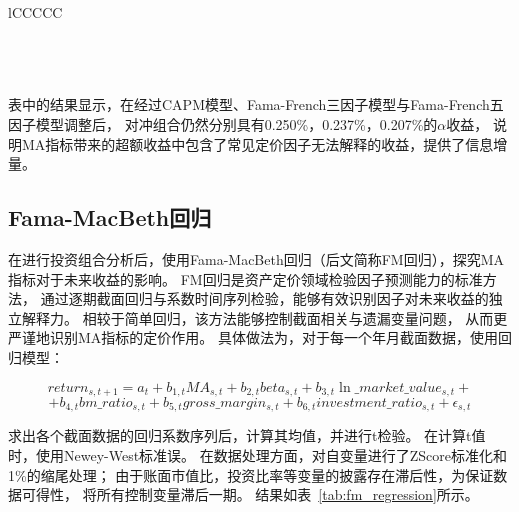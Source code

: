 {\begin{table}[H]
\begin{tabularx}{\textwidth}{lCCCCC}
    \bottomrule
     \\
     \\
     \\
     \\
  \end{tabularx}
\end{table}
}

表中的结果显示，在经过CAPM模型、Fama-French三因子模型与Fama-French五因子模型调整后，
对冲组合仍然分别具有0.250\%，0.237\%，0.207\%的$\alpha$收益，
说明MA指标带来的超额收益中包含了常见定价因子无法解释的收益，提供了信息增量。

 \FloatBarrier

\subsection{Fama-MacBeth回归}

在进行投资组合分析后，使用Fama-MacBeth回归（后文简称FM回归），探究MA指标对于未来收益的影响。
FM回归是资产定价领域检验因子预测能力的标准方法，
通过逐期截面回归与系数时间序列检验，能够有效识别因子对未来收益的独立解释力。
相较于简单回归，该方法能够控制截面相关与遗漏变量问题，
从而更严谨地识别MA指标的定价作用。
具体做法为，对于每一个年月截面数据，使用回归模型：

\[
return_{s,t+1} = a_{t} + b_{1,t} MA_{s,t} + b_{2,t} beta_{s,t} + b_{3,t} \ln\_market\_value_{s,t} +
\]
\[
+ b_{4,t} bm\_ratio_{s,t} + b_{5,t} gross\_margin_{s,t} + b_{6,t} investment\_ratio_{s,t} + \epsilon_{s,t}
\]

求出各个截面数据的回归系数序列后，计算其均值，并进行t检验。
在计算t值时，使用Newey-West标准误。
在数据处理方面，对自变量进行了ZScore标准化和1\%的缩尾处理；
由于账面市值比，投资比率等变量的披露存在滞后性，为保证数据可得性，
将所有控制变量滞后一期。
结果如表~\ref{tab:fm_regression}所示。

